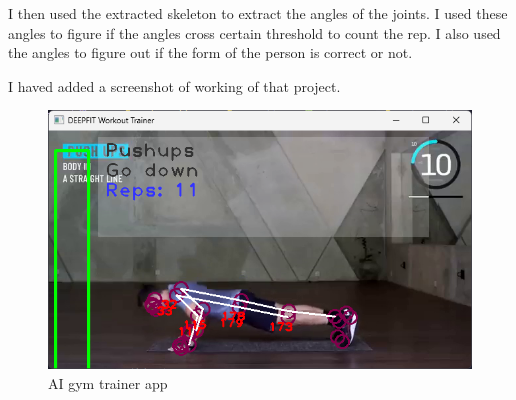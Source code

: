 I then used the extracted skeleton to extract the angles of the joints. I used these angles to figure if the angles cross certain threshold to count the rep. I also used the angles to figure out if the form of the person is correct or not.

I haved added a screenshot of working of that project.

\begin{figure}[H]
    \centering
    \includegraphics[width=.8\textwidth]{res/deepfit.png}
    \caption{AI gym trainer app}
    \label{fig:2_deepfit}
\end{figure}